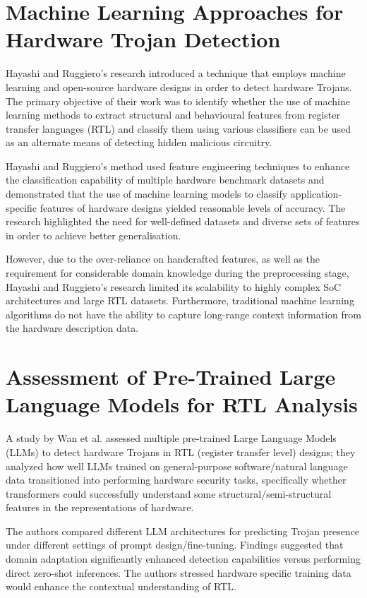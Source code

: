 \documentclass[12pt,a4paper]{report}
\begin{document}
\section{Machine Learning Approaches for Hardware Trojan Detection}

Hayashi and Ruggiero's research introduced a technique that employs machine learning and open-source hardware designs in order to detect hardware Trojans. The primary objective of their work was to identify whether the use of machine learning methods to extract structural and behavioural features from register transfer languages (RTL) and classify them using various classifiers can be used as an alternate means of detecting hidden malicious circuitry.

Hayashi and Ruggiero's method used feature engineering techniques to enhance the classification capability of multiple hardware benchmark datasets and demonstrated that the use of machine learning models to classify application-specific features of hardware designs yielded reasonable levels of accuracy. The research highlighted the need for well-defined datasets and diverse sets of features in order to achieve better generalisation.

However, due to the over-reliance on handcrafted features, as well as the requirement for considerable domain knowledge during the preprocessing stage, Hayashi and Ruggiero's research limited its scalability to highly complex SoC architectures and large RTL datasets. Furthermore, traditional machine learning algorithms do not have the ability to capture long-range context information from the hardware description data.

\section{Assessment of Pre-Trained Large Language Models for RTL Analysis}

A study by Wan et al. assessed multiple pre-trained Large Language Models (LLMs) to detect hardware Trojans in RTL (register transfer level) designs; they analyzed how well LLMs trained on general-purpose software/natural language data transitioned into performing hardware security tasks, specifically whether transformers could successfully understand some structural/semi-structural features in the representations of hardware.

The authors compared different LLM architectures for predicting Trojan presence under different settings of prompt design/fine-tuning. Findings suggested that domain adaptation significantly enhanced detection capabilities versus performing direct zero-shot inferences. The authors stressed hardware specific training data would enhance the contextual understanding of RTL.
\end{document}
